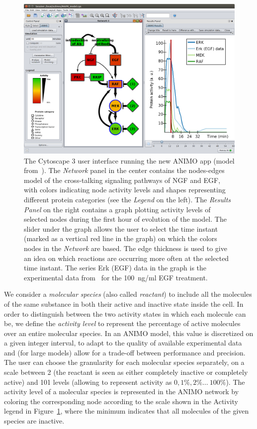 \documentclass{llncs}
\begin{document}
\begin{figure}[htb]
\begin{center}
   \includegraphics[width=.7\textwidth]{images/ANIMO3_MAPK_model} %
\end{center}
\caption{The Cytoscape 3 user interface running the new ANIMO app
(model from~\cite{animo-ieee}). The \emph{Network} panel in the center contains the nodes-edges
model of the cross-talking signaling pathways of NGF and EGF, with
colors indicating node activity levels and shapes representing different protein categories (see the \emph{Legend} on the left).
The \emph{Results Panel} on the right contains a graph plotting activity levels of selected nodes
during the first hour of evolution of the model. The slider under the graph
allows the user to select the time instant (marked as a vertical red line in the graph) on which
the colors nodes in the \emph{Network} are based. The edge thickness is used to give an idea on which reactions are
occurring more often at the selected time instant.
The series {\sf Erk (EGF) data} in the graph is the experimental
data from~\cite{egf-ngf} for the 100~ng/ml EGF treatment.
\label{fig:cytoscape}}
\end{figure}

We consider a \emph{molecular species} (also called \emph{reactant}) to include all the molecules of the same substance in both their active
and inactive state inside the cell. In order to distinguish between the two activity states in which each molecule can be,
we define the \emph{activity level}
to represent the percentage of active molecules over an entire molecular species. In an ANIMO model, this value
is discretized on a given integer interval, to adapt to the quality
of available experimental data and (for large models) allow for a trade-off between performance and precision.
The user can choose the granularity for each molecular species separately, on a scale between 2 (the
reactant is seen as either completely inactive or completely active) and 101 levels (allowing to represent activity as $0, 1\%, 2\% \dots\ 100\%$).
The activity level of a molecular species is represented in the ANIMO network
by coloring the corresponding node according to the scale shown in the {\sf Activity} legend in Figure~\ref{fig:cytoscape},
where the minimum indicates that all molecules of the given species are inactive.
\end{document}
